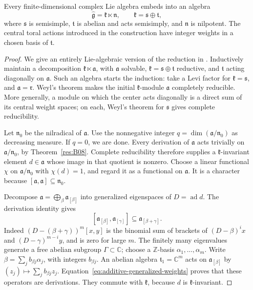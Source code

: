 \begin{proposition}\label{res:I09}
Every finite-dimensional complex Lie algebra embeds into an algebra
\[
 \widehat{\mathfrak g}=\mathfrak k\ltimes\mathfrak n,\qquad
 \mathfrak k=\mathfrak s\oplus\mathfrak t,
\]
where \(\mathfrak s\) is semisimple, \(\mathfrak t\) is abelian
and acts semisimply, and \(\mathfrak n\) is nilpotent.
The central toral actions introduced in the construction have
integer weights in a chosen basis of \(\mathfrak t\).
\end{proposition}
\begin{proof}
We give an entirely Lie-algebraic version of the reduction in
\cite[Proposition 50.3]{etingof}. Inductively maintain a decomposition
\(\mathfrak k\ltimes\mathfrak a\), with \(\mathfrak a\) solvable,
\(\mathfrak k=\mathfrak s\oplus\mathfrak t\) reductive, and
\(\mathfrak t\) acting diagonally on \(\mathfrak a\).
Such an algebra starts the induction: take a Levi factor for
\(\mathfrak k=\mathfrak s\), and \(\mathfrak a=\mathfrak r\).
Weyl's theorem makes the initial \(\mathfrak k\)-module
\(\mathfrak a\) completely reducible. More generally, a module
on which the center acts diagonally is a direct sum of its central
weight spaces; on each, Weyl's theorem for \(\mathfrak s\)
gives complete reducibility.

Let \(\mathfrak n_0\) be the nilradical of \(\mathfrak a\).
Use the nonnegative integer \(q=\dim(\mathfrak a/\mathfrak n_0)\)
as decreasing measure. If \(q=0\), we are done.
Every derivation of \(\mathfrak a\) acts trivially on
\(\mathfrak a/\mathfrak n_0\), by Theorem~\ref{res:B08}.
Complete reducibility therefore supplies a
\(\mathfrak k\)-invariant element \(d\in\mathfrak a\)
whose image in that quotient is nonzero. Choose a linear
functional \(\chi\) on \(\mathfrak a/\mathfrak n_0\) with
\(\chi(d)=1\), and regard it as a functional on \(\mathfrak a\).
It is a character because
\([\mathfrak a,\mathfrak a]\subseteq\mathfrak n_0\).

Decompose \(\mathfrak a=\bigoplus_\beta\mathfrak a_{[\beta]}\)
into generalized eigenspaces of \(D=\operatorname{ad}d\).
The derivation identity gives
\[
 [\mathfrak a_{[\beta]},\mathfrak a_{[\gamma]}]
 \subseteq\mathfrak a_{[\beta+\gamma]}.
 \tag{9.3}\label{eq:additive-generalized-weights}
\]
Indeed \((D-(\beta+\gamma))^m[x,y]\) is the binomial sum of brackets
of \((D-\beta)^i x\) and \((D-\gamma)^{m-i}y\), and is zero for
large \(m\). The finitely many eigenvalues generate a free
abelian subgroup \(\Gamma\subset\mathbb C\); choose a
\(\mathbb Z\)-basis \(\alpha_1,\ldots,\alpha_m\).
Write \(\beta=\sum_j b_{\beta j}\alpha_j\), with integers
\(b_{\beta j}\).
An abelian algebra \(\mathfrak t_1=\mathbb C^m\) acts on
\(\mathfrak a_{[\beta]}\) by
\((z_j)\mapsto\sum_j b_{\beta j}z_j\).
Equation~\eqref{eq:additive-generalized-weights} proves that these
operators are derivations. They commute with \(\mathfrak k\),
because \(d\) is \(\mathfrak k\)-invariant.


\end{proof}
